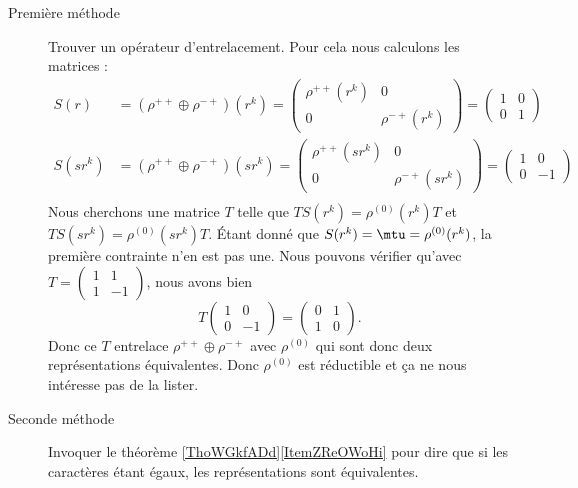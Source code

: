 \begin{enumerate}
\begin{description}
            \item[Première méthode]
                Trouver un opérateur d'entrelacement. Pour cela nous calculons les matrices :
        \begin{subequations}
            \begin{align}
                S(r)&=(\rho^{++}\oplus \rho^{-+})(r^k)=\begin{pmatrix}
                    \rho^{++}(r^k)    &   0    \\ 
                    0  &   \rho^{-+}(r^k)    
                \end{pmatrix}=\begin{pmatrix}
                    1    &   0    \\ 
                    0    &   1    
                \end{pmatrix}\\
                S(sr^k)&=(\rho^{++}\oplus \rho^{-+})(sr^k)=\begin{pmatrix}
                    \rho^{++}(sr^k)    &   0    \\ 
                    0  &   \rho^{-+}(sr^k)    
                \end{pmatrix}=\begin{pmatrix}
                    1    &   0    \\ 
                    0    &   -1    
                \end{pmatrix}\\
            \end{align}
        \end{subequations}
        Nous cherchons une matrice \( T\) telle que \( TS(r^k)=\rho^{(0)}(r^k)T\) et \( TS(sr^k)=\rho^{(0)}(sr^k)T\). Étant donné que \( S(r^k)=\mtu=\rho^{(0)}(r^k)\), la première contrainte n'en est pas une. Nous pouvons vérifier qu'avec \( T=\begin{pmatrix}
            1    &   1    \\ 
            1    &   -1    
        \end{pmatrix}\), nous avons bien
        \begin{equation}
            T\begin{pmatrix}
                1    &   0    \\ 
                0    &   -1    
            \end{pmatrix}=\begin{pmatrix}
                0    &   1    \\ 
                1    &   0    
            \end{pmatrix}.
        \end{equation}
        Donc ce \( T\) entrelace \( \rho^{++}\oplus \rho^{-+}\) avec \( \rho^{(0)}\) qui sont donc deux représentations équivalentes. Donc \( \rho^{(0)}\) est réductible et ça ne nous intéresse pas de la lister.
            \item[Seconde méthode] 
                Invoquer le théorème \ref{ThoWGkfADd}\ref{ItemZReOWoHi} pour dire que si les caractères étant égaux, les représentations sont équivalentes.


\end{description}
\end{enumerate}
